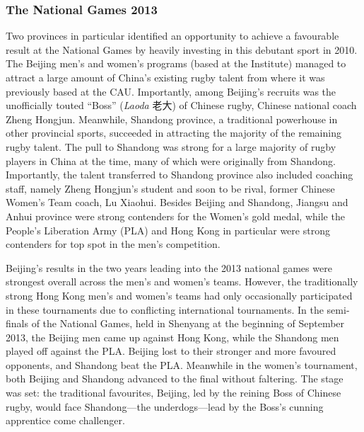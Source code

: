 \begin{CJK}{UTF8}{gbsn}
\subsubsection{The National Games 2013 \label{sect:fallFromGrace}}
Two provinces in particular identified an opportunity to achieve a favourable result at the National Games by heavily investing in this debutant sport in 2010.  The Beijing men's and women's programs (based at the Institute) managed to attract a large amount of China's existing rugby talent from where it was previously based at the CAU.  Importantly, among Beijing's recruits was the unofficially touted ``Boss''  (\textit{Laoda} 老大) of Chinese rugby, Chinese national coach Zheng Hongjun.  Meanwhile, Shandong province, a traditional powerhouse in other provincial sports, succeeded in attracting the majority of the remaining rugby talent.  The pull to Shandong was strong for a large majority of rugby players in China at the time, many of which were originally from Shandong.  Importantly, the talent transferred to Shandong province also included coaching staff, namely Zheng Hongjun's student and soon to be rival, former Chinese Women's Team coach, Lu Xiaohui.  Besides Beijing and Shandong, Jiangsu and Anhui province were strong contenders for the Women's gold medal, while the People's Liberation Army (PLA) and Hong Kong in particular were strong contenders for top spot in the men's competition.

Beijing's results in the two years leading into the 2013 national games were strongest overall across the men's and women's teams.   However, the traditionally strong Hong Kong men's and women's teams had only occasionally participated in these tournaments due to conflicting international tournaments.  In the semi-finals of the National Games, held in Shenyang at the beginning of September 2013, the Beijing men came up against Hong Kong, while the Shandong men played off against the PLA.  Beijing lost to their stronger and more favoured opponents, and Shandong beat the PLA.  Meanwhile in the women's tournament, both Beijing and Shandong advanced to the final without faltering.  The stage was set: the traditional favourites, Beijing, led by the reining Boss of Chinese rugby, would face Shandong---the underdogs---lead by the Boss's cunning apprentice come challenger.


\end{CJK}
